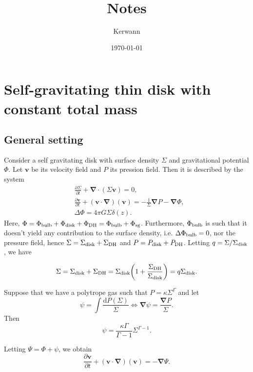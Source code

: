 \documentclass[11pt]{article}
\author{Kerwann}
\date{\today}
\title{Notes}
\newcommand{\bv}{\boldsymbol{v}}
\newcommand{\bnab}{\boldsymbol{\nabla}}
\newcommand{\rd}{\mathrm{d}}
\newcommand{\Sigmad}{\Sigma_{\rm{disk}}}
\newcommand{\Sigmadh}{\Sigma_{\rm{DH}}}
\newcommand{\Phib}{\Phi_{\rm{bulb}}}
\newcommand{\Phid}{\Phi_{\rm{disk}}}
\newcommand{\Phidh}{\Phi_{\rm{DH}}}
\newcommand{\Phisg}{\Phi_{\rm{sg}}}
\begin{document}
\maketitle

\tableofcontents


\section{Self-gravitating thin disk with constant total mass}
\label{sec:sg_disk_cst_mass}

\subsection{General setting}

Consider a self gravitating disk with surface density $\Sigma$ and gravitational potential $\Phi$. Let $\bv$ be its velocity field and $P$ its pression field. Then it is described by the system
\begin{align}
&\frac{\partial \Sigma}{\partial t} + \bnab \cdot (\Sigma \bv) = 0 ,\\
&\frac{\partial \bv}{\partial t} + (\bv \cdot \bnab)(\bv) = -\frac{1}{\Sigma} \bnab P - \bnab \Phi ,\\
& \Delta \Phi = 4\pi G \Sigma \delta (z).
\end{align}
Here, $\Phi =\Phib+  \Phid +  \Phidh=\Phib +  \Phisg$. Furthermore, $\Phib$  is such that it doesn't yield any contribution to the surface density, i.e. $\Delta \Phib=0$, nor the pressure field, hence $\Sigma =\Sigmad+\Sigmadh$ and $P =P_{\rm{disk}}+P_{\rm{DH}}$. Letting $q=\Sigma/\Sigmad$, we have

\begin{equation}
\Sigma=\Sigmad+\Sigma_{\rm{DH}}=\Sigmad\bigg(1+\frac{\Sigmadh}{\Sigmad}\bigg) =q \Sigmad.
\end{equation}

Suppose that we have a polytrope gas such that $P=\kappa \Sigma^{\Gamma}$ and let
\begin{equation}
\psi = \int \frac{\rd P(\Sigma)}{\Sigma} \Leftrightarrow \bnab \psi = \frac{\bnab P}{\Sigma}.
\end{equation}
 Then
 \begin{equation}
\psi = \frac{\kappa \Gamma}{\Gamma-1} \Sigma^{\Gamma-1}.
\end{equation}
 
 Letting $\Psi = \Phi + \psi$, we obtain
\begin{equation}
\frac{\partial \bv}{\partial t} + (\bv \cdot \bnab)(\bv) = - \bnab \Psi.
\end{equation}
\end{document}
